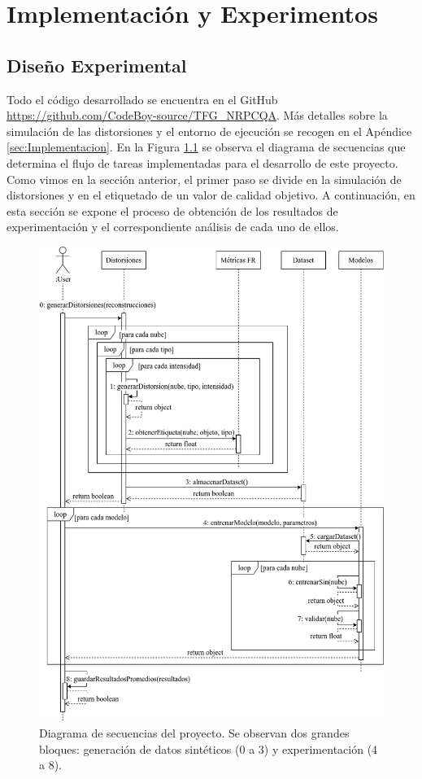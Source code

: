 \chapter{Implementación y Experimentos} 
\section{Diseño Experimental} 

Todo el código desarrollado se encuentra 
en el GitHub \url{https://github.com/CodeBoy-source/TFG_NRPCQA}.
Más detalles sobre la simulación de las distorsiones y el entorno de 
ejecución se recogen en el Apéndice \ref{sec:Implementacion}.
En la Figura \ref{fig:TFGSequence} se observa el diagrama de secuencias 
que determina el flujo de tareas implementadas para el desarrollo de este proyecto. 
Como vimos en la sección anterior, el primer paso se divide en la simulación 
de distorsiones y en el etiquetado de un valor de calidad objetivo.
A continuación, en esta sección se expone el proceso de obtención de los resultados de 
experimentación y el correspondiente análisis de cada uno de ellos. 

\begin{figure}[htp]
  \begin{center}
    \includegraphics[width=\textwidth]{imagenes/chapter5/TFGSequence}
  \end{center}
  \caption{Diagrama de secuencias del proyecto. Se observan dos grandes bloques:
    generación de datos sintéticos (0 a 3) y experimentación (4 a 8).  }
  \label{fig:TFGSequence}
\end{figure}
  


